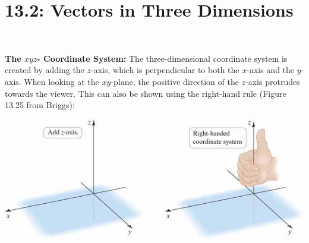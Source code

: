 \documentclass[../mathNotesPreamble]{subfiles}
\begin{document}
\section{13.2: Vectors in Three Dimensions}~

  \textbf{The $xyz$- Coordinate System:}\newline
    The three-dimensional coordinate system is created by adding the $z$-axis, which is perpendicular to both the $x$-axis and the $y$-axis. When looking at the $xy$-plane, the positive direction of the $z$-axis protrudes towards the viewer. This can also be shown using the right-hand rule (Figure 13.25 from Briggs):
    \begin{center}
      \includegraphics[width=0.7\linewidth]{../images/briggs_13_02/fig13_25}
    \end{center}
\end{document}
